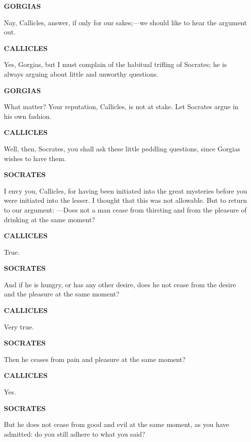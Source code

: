 \documentclass[11pt,letter]{article}
\begin{document}
\par \textbf{GORGIAS}
\par   Nay, Callicles, answer, if only for our sakes;—we should like to hear the argument out.

\par \textbf{CALLICLES}
\par   Yes, Gorgias, but I must complain of the habitual trifling of Socrates; he is always arguing about little and unworthy questions.

\par \textbf{GORGIAS}
\par   What matter? Your reputation, Callicles, is not at stake. Let Socrates argue in his own fashion.

\par \textbf{CALLICLES}
\par   Well, then, Socrates, you shall ask these little peddling questions, since Gorgias wishes to have them.

\par \textbf{SOCRATES}
\par   I envy you, Callicles, for having been initiated into the great mysteries before you were initiated into the lesser. I thought that this was not allowable. But to return to our argument: —Does not a man cease from thirsting and from the pleasure of drinking at the same moment?

\par \textbf{CALLICLES}
\par   True.

\par \textbf{SOCRATES}
\par   And if he is hungry, or has any other desire, does he not cease from the desire and the pleasure at the same moment?

\par \textbf{CALLICLES}
\par   Very true.

\par \textbf{SOCRATES}
\par   Then he ceases from pain and pleasure at the same moment?

\par \textbf{CALLICLES}
\par   Yes.

\par \textbf{SOCRATES}
\par   But he does not cease from good and evil at the same moment, as you have admitted:  do you still adhere to what you said?
\end{document}
